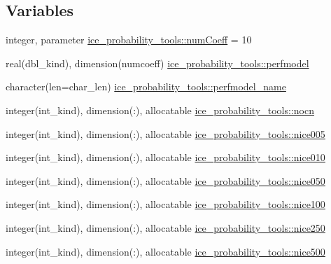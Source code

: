 \subsection*{Variables}
\begin{DoxyCompactItemize}
\item 
integer, parameter \hyperlink{namespaceice__probability__tools_a19cc6dcab9584f8783ab3cece86c3966}{ice\_\-probability\_\-tools::numCoeff} = 10
\item 
real(dbl\_\-kind), dimension(numcoeff) \hyperlink{namespaceice__probability__tools_af927f37aef7bc03ca64ba094ea588760}{ice\_\-probability\_\-tools::perfmodel}
\item 
character(len=char\_\-len) \hyperlink{namespaceice__probability__tools_a5907d2a055440e7db18603f97f34d6d3}{ice\_\-probability\_\-tools::perfmodel\_\-name}
\item 
integer(int\_\-kind), dimension(:), allocatable \hyperlink{namespaceice__probability__tools_aff66cd322edf027b1f82d23dca0e277e}{ice\_\-probability\_\-tools::nocn}
\item 
integer(int\_\-kind), dimension(:), allocatable \hyperlink{namespaceice__probability__tools_a9061fb8c3f06ed148c2a394fc1af7536}{ice\_\-probability\_\-tools::nice005}
\item 
integer(int\_\-kind), dimension(:), allocatable \hyperlink{namespaceice__probability__tools_a721bb86743f1f3f3b051779bbddcd27e}{ice\_\-probability\_\-tools::nice010}
\item 
integer(int\_\-kind), dimension(:), allocatable \hyperlink{namespaceice__probability__tools_a9263f16b9cec2512c8b0c9d1b07fbd2d}{ice\_\-probability\_\-tools::nice050}
\item 
integer(int\_\-kind), dimension(:), allocatable \hyperlink{namespaceice__probability__tools_aea9a275f5ab127afd6106f0377adb741}{ice\_\-probability\_\-tools::nice100}
\item 
integer(int\_\-kind), dimension(:), allocatable \hyperlink{namespaceice__probability__tools_a28e6a34d3f9ec9f1edc6985ba263b41a}{ice\_\-probability\_\-tools::nice250}
\item 
integer(int\_\-kind), dimension(:), allocatable \hyperlink{namespaceice__probability__tools_ad3ea4a7f9fd8145949defb7e6ece246d}{ice\_\-probability\_\-tools::nice500}
\end{DoxyCompactItemize}

